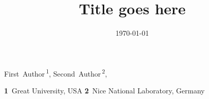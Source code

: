 \documentclass[11pt]{article}
\begin{document}
\title{\textbf{Title goes here}}

\date{\today}

\begin{center}
First~Author\,\textsuperscript{1},
Second~Author\,\textsuperscript{2},
\end{center}

\begin{center}
\textbf{1}~Great University, USA
\textbf{2}~Nice National Laboratory, Germany
\end{center}










\def\thefootnote{\fnsymbol{footnote}}
\setcounter{footnote}{0}

\clearpage
{}


\end{document}

